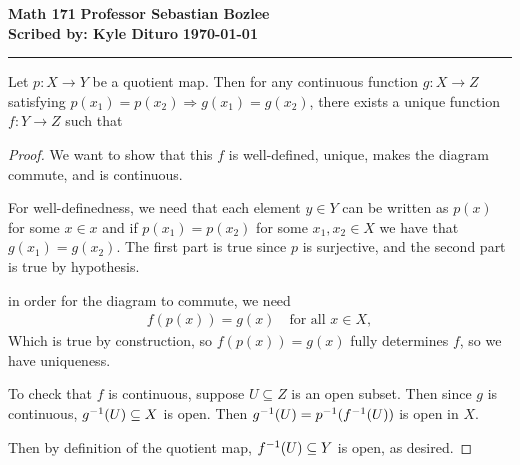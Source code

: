 \documentclass[12pt, twosided]{article}
\begin{document}
\noindent \textbf{Math 171} \hfill \textbf{Professor Sebastian Bozlee} \\
\textbf{Scribed by: Kyle Dituro} \hfill \textbf{\today}\hrule
\vspace{.2in}

\begin{thm}
  Let \(p: X \to Y\) be a quotient map. Then for any continuous function \(g: X \to Z\) satisfying \(p(x_1) = p(x_2) \Rightarrow g(x_1) = g(x_2)\), there exists a unique function \(f: Y \to Z\) such that
  \begin{center}
  \end{center}
\end{thm}

\begin{proof}
  We want to show that this \(f\) is well-defined, unique, makes the diagram commute, and is continuous.

  For well-definedness, we need that each element \(y \in Y\) can be written as \(p(x)\) for some \(x \in x\) and if \(p(x_1) = p(x_2)\) for some \(x_1, x_2 \in X\) we have that \(g(x_1) = g(x_2)\). The first part is true since \(p\) is surjective, and the second part is true by hypothesis.

  in order for the diagram to commute, we need
  \begin{align*}
    f(p(x)) = g(x) \quad \text{for all } x\in X,
  \end{align*}
  Which is true by construction, so \(f(p(x)) = g(x)\) fully determines \(f\), so we have uniqueness.

  To check that \(f\) is continuous, suppose \(U \subseteq Z\) is an open subset. Then since \(g\) is continuous, \(g^{-1}(U) \subseteq X\) is open. Then \(g^{-1}(U) = p^{-1}(f^{-1}(U))\) is open in \(X\).

  Then by definition of the quotient map, \(f^{-1}(U) \subseteq Y\) is open, as desired.
\end{proof}
\end{document}
